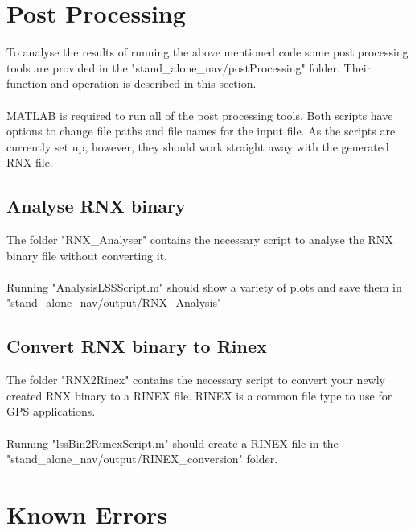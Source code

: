 \documentclass[10pt,a4paper]{article}
\begin{document}
\section{Post Processing}
To analyse the results of running the above mentioned code some post processing tools are provided in the "stand\_alone\_nav/postProcessing" folder. Their function and operation is described in this section. \\ \\
\noindent
MATLAB is required to run all of the post processing tools. Both scripts have options to change file paths and file names for the input file. As the scripts are currently set up, however, they should work straight away with the generated RNX file.
\subsection{Analyse RNX binary}
The folder "RNX\_Analyser" contains the necessary script to analyse the RNX binary file without converting it. \\ \\
\noindent
Running "AnalysisLSSScript.m" should show a variety of plots and save them in "stand\_alone\_nav/output/RNX\_Analysis"
\subsection{Convert RNX binary to Rinex}
The folder "RNX2Rinex" contains the necessary script to convert your newly created RNX binary to a RINEX file. RINEX is a common file type to use for GPS applications.\\ \\
\noindent
Running "lssBin2RunexScript.m" should create a RINEX file in the "stand\_alone\_nav/output/RINEX\_conversion" folder.







\section{Known Errors}
\end{document}
